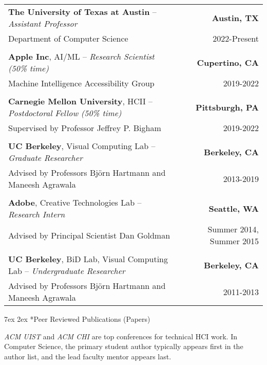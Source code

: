 \documentclass[letterpaper]{article}
\makeatletter
\renewcommand\section{\@startsection {section}{1}{\z@}%
      {7ex}%
      {2ex}%
      {\normalfont\Large\bfseries\SS@sectfont}}
\makeatother
\begin{document}
\begin{tabularx}{\textwidth}{Xr}

	\textbf{The University of Texas at Austin} -- \textit{Assistant Professor} & \textbf{Austin, TX} \\
	Department of Computer Science & 2022-Present \\
	\\


	\textbf{Apple Inc}, AI/ML -- \textit{Research Scientist (50\% time)} & \textbf{Cupertino, CA} \\
	Machine Intelligence Accessibility Group & 2019-2022 \\
	\\

	\textbf{Carnegie Mellon University}, HCII -- \textit{Postdoctoral Fellow (50\% time)} & \textbf{Pittsburgh, PA} \\
	Supervised by Professor Jeffrey P. Bigham & 2019-2022 \\
	\\

	\textbf{UC Berkeley}, Visual Computing Lab -- \textit{Graduate Researcher} & \textbf{Berkeley, CA} \\
	Advised by Professors Björn Hartmann and Maneesh Agrawala & 2013-2019 \\
	\\

	\textbf{Adobe}, Creative Technologies Lab -- \textit{Research Intern} & \textbf{Seattle, WA} \\
	Advised by Principal Scientist Dan Goldman & Summer 2014, Summer 2015 \\
	\\

	\textbf{UC Berkeley}, BiD Lab, Visual Computing Lab -- \textit{Undergraduate Researcher} & \textbf{Berkeley, CA} \\
	Advised by Professors Björn Hartmann and Maneesh Agrawala & 2011-2013
\end{tabularx}

\section*{Peer Reviewed Publications (Papers)}

\emph{ACM UIST} and \emph{ACM CHI} are top conferences for technical HCI work. In Computer Science, the primary student author typically appears first in the author list, and the lead faculty mentor appears last.
\end{document}
